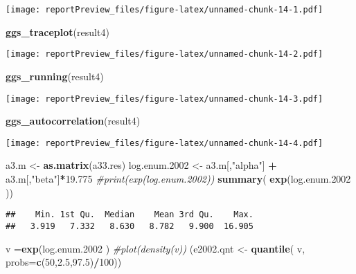 \documentclass[]{article}
\newenvironment{Shaded}{\begin{snugshade}}{\end{snugshade}}
\newcommand{\KeywordTok}[1]{\textcolor[rgb]{0.13,0.29,0.53}{\textbf{#1}}}
\newcommand{\DataTypeTok}[1]{\textcolor[rgb]{0.13,0.29,0.53}{#1}}
\newcommand{\DecValTok}[1]{\textcolor[rgb]{0.00,0.00,0.81}{#1}}
\newcommand{\FloatTok}[1]{\textcolor[rgb]{0.00,0.00,0.81}{#1}}
\newcommand{\StringTok}[1]{\textcolor[rgb]{0.31,0.60,0.02}{#1}}
\newcommand{\CommentTok}[1]{\textcolor[rgb]{0.56,0.35,0.01}{\textit{#1}}}
\newcommand{\OperatorTok}[1]{\textcolor[rgb]{0.81,0.36,0.00}{\textbf{#1}}}
\newcommand{\NormalTok}[1]{#1}
\begin{document}
\texttt{[image: reportPreview\_files/figure-latex/unnamed-chunk-14-1.pdf]}

\begin{Shaded}
\begin{Highlighting}[]
\KeywordTok{ggs_traceplot}\NormalTok{(result4)}
\end{Highlighting}
\end{Shaded}

\texttt{[image: reportPreview\_files/figure-latex/unnamed-chunk-14-2.pdf]}

\begin{Shaded}
\begin{Highlighting}[]
\KeywordTok{ggs_running}\NormalTok{(result4)}
\end{Highlighting}
\end{Shaded}

\texttt{[image: reportPreview\_files/figure-latex/unnamed-chunk-14-3.pdf]}

\begin{Shaded}
\begin{Highlighting}[]
\KeywordTok{ggs_autocorrelation}\NormalTok{(result4)}
\end{Highlighting}
\end{Shaded}

\texttt{[image: reportPreview\_files/figure-latex/unnamed-chunk-14-4.pdf]}

\begin{Shaded}
\begin{Highlighting}[]
\NormalTok{ a3.m <-}\StringTok{ }\KeywordTok{as.matrix}\NormalTok{(a33.res)}
\NormalTok{log.enum.}\DecValTok{2002}\NormalTok{ <-}\StringTok{ }\NormalTok{a3.m[,}\StringTok{"alpha"}\NormalTok{] }\OperatorTok{+}\StringTok{ }\NormalTok{a3.m[,}\StringTok{"beta"}\NormalTok{]}\OperatorTok{*}\FloatTok{19.775}
\CommentTok{#print(exp(log.enum.2002))}
\KeywordTok{summary}\NormalTok{( }\KeywordTok{exp}\NormalTok{(log.enum.}\DecValTok{2002}\NormalTok{ ))}
\end{Highlighting}
\end{Shaded}

\begin{verbatim}
##    Min. 1st Qu.  Median    Mean 3rd Qu.    Max. 
##   3.919   7.332   8.630   8.782   9.900  16.905
\end{verbatim}

\begin{Shaded}
\begin{Highlighting}[]
\NormalTok{v =}\KeywordTok{exp}\NormalTok{(log.enum.}\DecValTok{2002}\NormalTok{ )}
\CommentTok{#plot(density(v))}
\NormalTok{(e2002.qnt <-}\StringTok{ }\KeywordTok{quantile}\NormalTok{( v, }\DataTypeTok{probs=}\KeywordTok{c}\NormalTok{(}\DecValTok{50}\NormalTok{,}\FloatTok{2.5}\NormalTok{,}\FloatTok{97.5}\NormalTok{)}\OperatorTok{/}\DecValTok{100}\NormalTok{))}
\end{Highlighting}
\end{Shaded}
\end{document}
